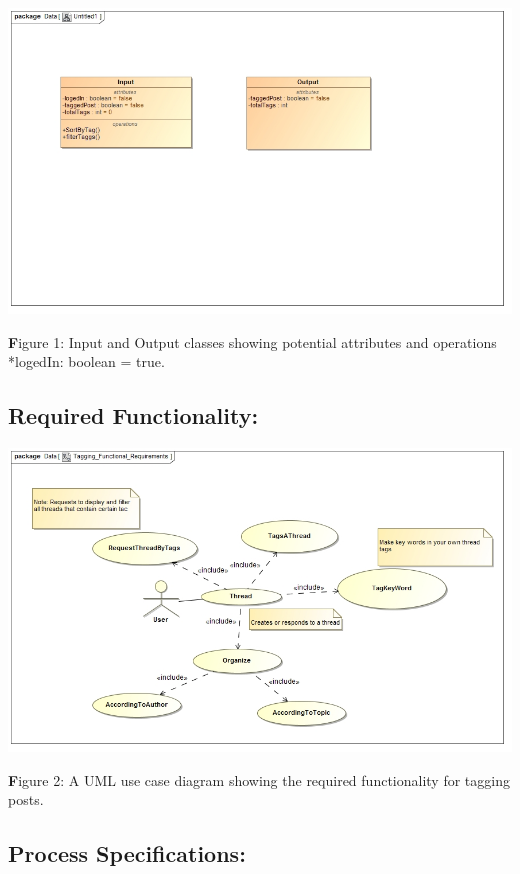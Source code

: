 \documentclass[a4paper,11pt]{article}
\begin{document}
\begin{center}
\includegraphics[width=0.9\linewidth]{Tag_Input_Output_ClassDiagram}
\end{center}

\textbf Figure 1: Input and Output classes showing potential attributes and operations *logedIn: boolean = true.

\subsection{Required Functionality:} 
\begin{center}
\includegraphics[width=0.9\linewidth]{Tagging_Functional_Requirements}
\end{center}

\textbf Figure 2: A UML use case diagram showing the required functionality for tagging posts.

\subsection{Process Specifications:} 
\end{document}
